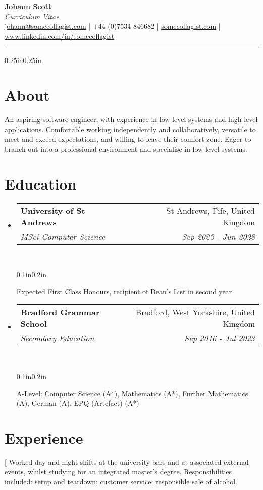 \documentclass[a4paper]{article}
\makeatletter
\newcommand{\emailaddr}{johann@somecollagist.com}
\newcommand{\phonenumber}{+44 (0)7534 846682}
\newcommand{\website}{somecollagist.com}
\newcommand{\linkedin}{www.linkedin.com/in/somecollagist}
\newcommand{\resumeSubheading}[5][]{
  \vspace{2pt}\item
    \begin{tabular*}{0.875\textwidth}[t]{l@{\extracolsep{\fill}}r}
      \textbf{#2} & #3 \\
      \textit{\small#4} & \textit{\small #5} \\
    \end{tabular*}\\
    \vspace{-5pt}
    \begin{adjustwidth}{0.1in}{0.2in}
      #1
    \end{adjustwidth}
    \vspace{10pt}
}
\newcommand{\resumeSubheadingList}[1]{
  \begin{itemize}
    #1
  \end{itemize}
}
\makeatother
\begin{document}
\begin{center}
  \huge \textbf{Johann Scott} \\
  \normalsize \textit{Curriculum Vitae} \\
  \vspace{1em}
  {
    \href{mailto:\emailaddr}{\emailaddr} {|}
    {\phonenumber} {|}
    \href{https://\website}{\website} {|}
    \href{https://\linkedin}{\linkedin}
  } \\
  \vspace{1em}
  \rule{\linewidth}{1pt}
\end{center}

\begin{adjustwidth}{0.25in}{0.25in}

  \section{About}
  An aspiring software engineer, with experience in low-level systems and
  high-level applications. Comfortable working independently and
  collaboratively, versatile to meet and exceed expectations, and willing to
  leave their comfort zone. Eager to branch out into a professional environment
  and specialise in low-level systems.

  \section{Education}
    \resumeSubheadingList{
      \resumeSubheading[
        Expected First Class Honours, recipient of Dean's List in second year.
      ]
        {University of St Andrews}
        {St Andrews, Fife, United Kingdom}
        {MSci Computer Science}
        {Sep 2023 {-} Jun 2028}
      \resumeSubheading[
        A-Level: Computer Science (A*), Mathematics (A*), Further
        Mathematics (A), German (A), EPQ (Artefact) (A*)
      ]
        {Bradford Grammar School}
        {Bradford, West Yorkshire, United Kingdom}
        {Secondary Education}
        {Sep 2016 {-} Jul 2023}
    }

  \section{Experience}
    \resumeSubheadingList{
      \resumeSubheading[
        Worked day and night shifts at the university bars and at associated
        external events, whilst studying for an integrated master's degree.
        Responsibilities included: setup and teardown; customer service;
        responsible sale of alcohol.

}
\end{adjustwidth}
\end{document}
